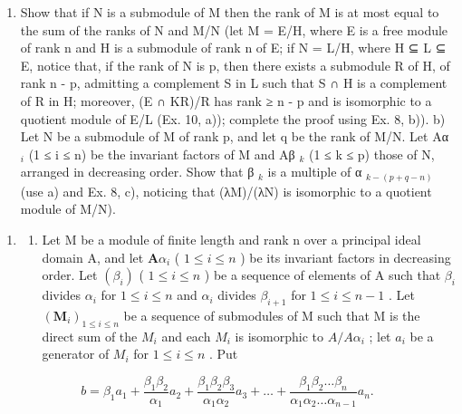 \begin{enumerate}
\def\labelenumi{\alph{enumi})}
\tightlist
\item
  Show that if N is a submodule of M then the rank of M is at most equal to the sum of the ranks of N and M/N (let M = E/H, where E is a free module of rank n and H is a submodule of rank n of E; if N = L/H, where H ⊆ L ⊆ E, notice that, if the rank of N is p, then there exists a submodule R of H, of rank n - p, admitting a complement S in L such that S ∩ H is a complement of R in H; moreover, (E ∩ KR)/R has rank ≥ n - p and is isomorphic to a quotient module of E/L (Ex. 10, a)); complete the proof using Ex. 8, b)). b) Let N be a submodule of M of rank p, and let q be the rank of M/N. Let Aα \(_{i}\) (1 ≤ i ≤ n) be the invariant factors of M and Aβ \(_{k}\) (1 ≤ k ≤ p) those of N, arranged in decreasing order. Show that β \(_{k}\) is a multiple of α \(_{k- (p + q - n)}\) (use a) and Ex. 8, c), noticing that (λM)/(λN) is isomorphic to a quotient module of M/N).
\end{enumerate}

\begin{enumerate}
\def\labelenumi{\arabic{enumi})}
\setcounter{enumi}{14}
\tightlist
\item
  \begin{enumerate}
  \def\labelenumii{\alph{enumii})}
  \tightlist
  \item
    Let M be a module of finite length and rank n over a principal ideal domain A, and let \(\mathbf{A}\alpha_{i}\) ( \(1 \leqslant i \leqslant n\) ) be its invariant factors in decreasing order. Let \((\beta_{i})\) ( \(1 \leqslant i \leqslant n\) ) be a sequence of elements of A such that \(\beta_{i}\) divides \(\alpha_{i}\) for \(1 \leqslant i \leqslant n\) and \(\alpha_{i}\) divides \(\beta_{i+1}\) for \(1 \leqslant i \leqslant n-1\) . Let \((\mathbf{M}_{i})_{1 \leqslant i \leqslant n}\) be a sequence of submodules of M such that M is the direct sum of the \(M_{i}\) and each \(M_{i}\) is isomorphic to \(A/A\alpha_{i}\) ; let \(a_{i}\) be a generator of \(M_{i}\) for \(1 \leqslant i \leqslant n\) . Put
  \end{enumerate}
\end{enumerate}

\[
b = \beta_ {1} a _ {1} + \frac {\beta_ {1} \beta_ {2}}{\alpha_ {1}} a _ {2} + \frac {\beta_ {1} \beta_ {2} \beta_ {3}}{\alpha_ {1} \alpha_ {2}} a _ {3} + \dots + \frac {\beta_ {1} \beta_ {2} \dots \beta_ {n}}{\alpha_ {1} \alpha_ {2} \dots \alpha_ {n - 1}} a _ {n}.
\]

